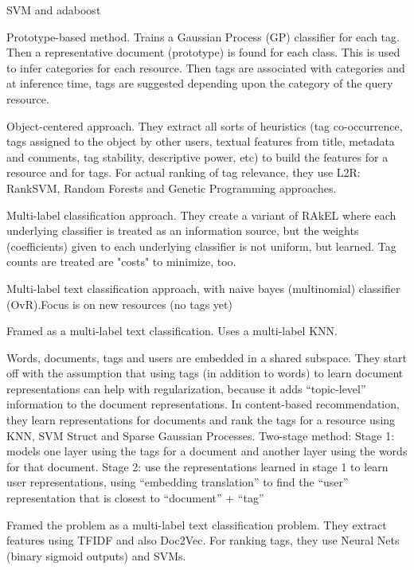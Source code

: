 \cite{illig_etal_2011}

\cite{lo_etal_2011} SVM and adaboost

\cite{song_etal_2011} 
Prototype-based method. Trains a Gaussian Process (GP) classifier for each tag. Then a representative document (prototype) is found for each class. This is used to infer categories for each resource. Then tags are associated with categories and at inference time, tags are suggested depending upon the category of the query resource.

\cite{belem_etal_2014}
Object-centered approach. They extract all sorts of heuristics (tag co-occurrence, tags assigned to the object by other users, textual features from title, metadata and comments, tag stability, descriptive power, etc) to build the features for a resource and for tags.
For actual ranking of tag relevance, they use L2R: RankSVM, Random Forests and Genetic Programming approaches.

\cite{lo_etal_2014}
Multi-label classification approach. They create a variant of RAkEL where each underlying classifier is treated as an information source, but the weights (coefficients) given to each underlying classifier is not uniform, but learned.
Tag counts are treated are "costs" to minimize, too.

\cite{yagnik_etal_2014} 
Multi-label text classification approach, with naive bayes (multinomial) classifier (OvR).Focus is on new resources (no tags yet)

\cite{charte_etal_2015}

Framed as a multi-label text classification. Uses a multi-label KNN.

\cite{kataria_agarwal_2015}
Words, documents, tags and users are embedded in a shared subspace.
They start off with the assumption that using tags (in addition to words) to learn document representations can help with regularization, because it adds “topic-level” information to the document representations.
In content-based recommendation, they learn representations for documents and rank the tags for a resource using KNN, SVM Struct and Sparse Gaussian Processes.
Two-stage method:
Stage 1: models one layer using the tags for a document and another layer using the words for that document.
Stage 2: use the representations learned in stage 1 to learn user representations, using “embedding translation” to find the “user” representation that is closest to “document” + “tag”

\cite{tao_yao_2016}

Framed the problem as a multi-label text classification problem. They extract features using TFIDF and also Doc2Vec. For ranking tags, they use Neural Nets (binary sigmoid outputs) and SVMs.

